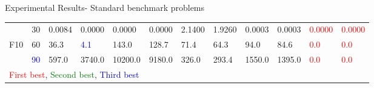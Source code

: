 \documentclass [9pt,times] {beamer}
\begin{document}
\begin{frame}[plain]{Experimental Results- Standard benchmark problems}
\begin{center}
\begin{tabular}{p{0.08in} | p{0.09in} | p{0.25in} |  p{0.23in} |  p{0.25in}|  p{0.25in} |  p{0.25in} | p{0.25in} |  p{0.25in} | p{0.25in} |  p{0.25in} |  p{0.25in}}
\hline																							
	&	30	&	0.0084	&	0.0000	&	0.0000	&	0.0000	&	2.1400	&	1.9260	&	0.0003	&	0.0003	&\textcolor{red}{	0.0000	}&\textcolor{red}{	0.0000	}\\
F10	&	60	&	36.3	&\textcolor{blue}{	4.1	}&	143.0	&	128.7	&	71.4	&	64.3	&	94.0	&	84.6	&\textcolor{red}{	0.0	}&\textcolor{red}{	0.0	}\\
	&\textcolor{blue}{	90	}&	597.0	&	3740.0	&	10200.0	&	9180.0	&	326.0	&	293.4	&	1550.0	&	1395.0	&\textcolor{red}{	0.0	}&\textcolor{red}{	0.0	}\\
\hline																							

\multicolumn{11}{l}{\textcolor{red}{First best}, \textcolor{green}{Second best}, \textcolor{blue}{Third best}}\\
\end{tabular}
\end{center}
  \end{frame}
  
  
  
\end{document}
